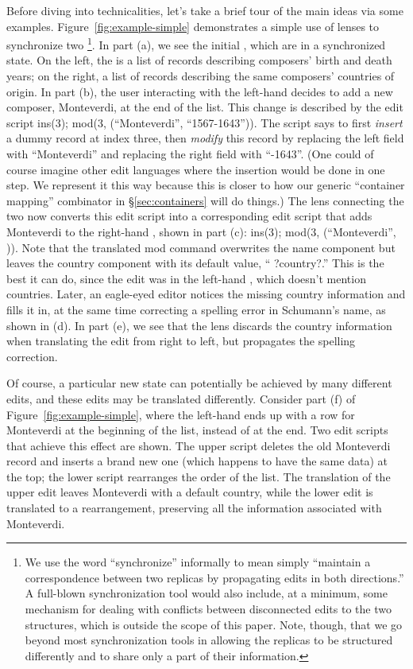 Before diving into technicalities, let's take a brief tour of the main
ideas via some examples.
%
Figure~\ref{fig:example-simple} demonstrates a simple use of {\edit} lenses
to synchronize two \replicas\ifdelta\footnote{We use the word ``synchronize''
  informally to mean simply ``maintain a correspondence between two replicas
  by propagating edits in both directions.''  A full-blown synchronization
  tool would also include, at a minimum, some mechanism for dealing with
  conflicts between disconnected edits to the two structures, which is
  outside the scope of this paper.  \iffull Note, though, that we go beyond most
  synchronization tools in allowing the replicas to be structured
  differently and to share only a part of their information.\fi}\fi.  In part (a),
we see the initial \replicas, which are in a synchronized state.  On the
left, the \replica is a list of records describing composers' birth and death
years; on the right,  a list of records describing the same
composers' countries of origin.  In part (b), the user interacting with the
left-hand \replica decides to add a new composer, {\sf Monteverdi}, at the
end of the list.  This change is described by the edit script
{\sf
ins(3); mod(3, (``Monteverdi'', ``1567-1643''))}.
The script says to first
\emph{insert} a dummy record at index three, then \emph{modify} this record by
replacing the left field with ``{\sf Monteverdi}'' and replacing the 
right field with ``{-1643}''.  (One could of course imagine other edit
languages where the insertion would be done in one step.  We represent it
this way because this is closer to how our generic ``container mapping''
combinator in \S \ref{sec:containers} will do things.)  The
lens connecting the two \replicas now converts this edit script into a
corresponding edit 
script that adds {\sf Monteverdi} to the right-hand \replica, shown in part (c):
{\sf
ins(3); mod(3, (``Monteverdi'', \ONE))}.
Note that the translated {\sf mod} command overwrites the name component but
leaves the country component with its default value, ``{\sf
  ?country?}.''  This is the best it can do, since the edit was in
the left-hand \replica, which doesn't mention countries.  
%
Later, an eagle-eyed editor notices the missing country information and
fills it in, at the same time correcting a spelling error in {\sf
  Schumann}'s name, as shown in (d). In part (e), we see that the lens
discards the country information when
translating the edit from right to left, but propagates the spelling
correction. 

Of course, a particular new \replica state can potentially be
achieved by many different edits, and these edits may be translated differently.
%
Consider part (f) of Figure~\ref{fig:example-simple}, where the left-hand
\replica ends up with a row for {\sf Monteverdi} at the beginning of the
list, instead of at the end. Two edit scripts that achieve this
effect are shown. The upper script deletes
the old {\sf Monteverdi} record and inserts a brand new one (which happens
to have 
the same data) at the top; the lower script rearranges the order of the
list.  The translation of the upper edit leaves {\sf Monteverdi} with a
default country, while the lower edit is translated to a
rearrangement, preserving all the information associated with {\sf
  Monteverdi}.%

